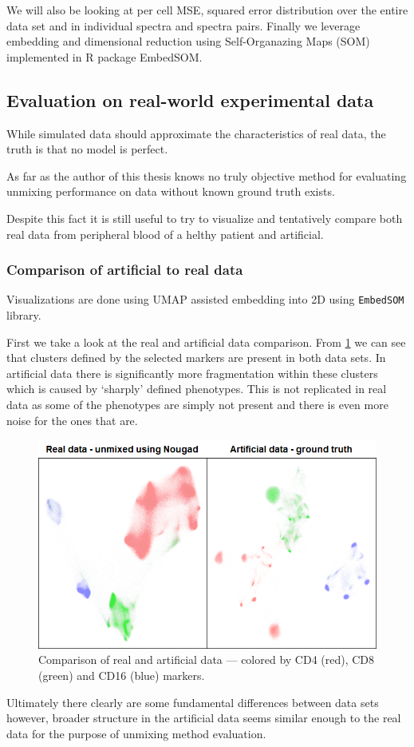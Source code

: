 We will also be looking at per cell MSE, squared error distribution over the entire data set and in individual spectra and spectra pairs. Finally we leverage embedding and dimensional reduction using Self-Organazing Maps (SOM) implemented in R package EmbedSOM\cite{ESOMpap}. 

\subsection{Evaluation on real-world experimental data}

While simulated data should approximate the characteristics of real data, the truth is that no model is perfect.

As far as the author of this thesis knows no truly objective method for evaluating unmixing performance on data without known ground truth exists.

Despite this fact it is still useful to try to visualize and tentatively compare both real data from peripheral blood of a helthy patient and artificial.

\subsubsection{Comparison of artificial to real data}
Visualizations are done using UMAP assisted embedding into 2D using \texttt{EmbedSOM} library. 

First we take a look at the real and artificial data comparison. From \cref{fig:SOM_comp} we can see that clusters defined by the selected markers are present in both data sets. In artificial data there is significantly more fragmentation within these clusters which is caused by `sharply' defined phenotypes. This is not replicated in real data as some of the phenotypes are simply not present and there is even more noise for the ones that are.

\begin{figure}
  \includegraphics[width=1\linewidth]{img/SOM_comp_real_artv2.png}
  \caption{Comparison of real and artificial data --- colored by CD4 (red), CD8 (green) and CD16 (blue) markers.}
  \label{fig:SOM_comp}
\end{figure}

Ultimately there clearly are some fundamental differences between data sets however, broader structure in the artificial data seems similar enough to the real data for the purpose of unmixing method evaluation. 

